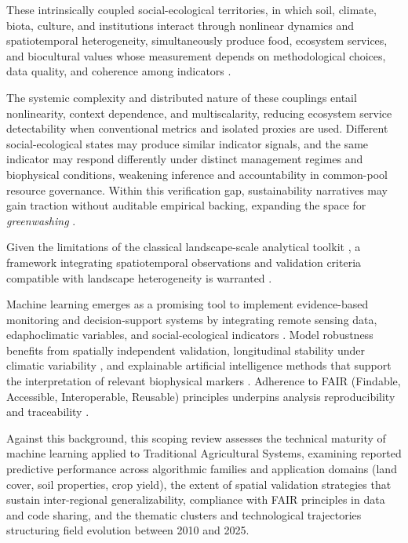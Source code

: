 \documentclass[lineno,pdflatex,sn-apa]{sn-jnl}
\begin{document}
These intrinsically coupled social-ecological territories, in which soil, climate, biota, culture, and institutions interact through nonlinear dynamics and spatiotemporal heterogeneity, simultaneously produce food, ecosystem services, and biocultural values whose measurement depends on methodological choices, data quality, and coherence among indicators \citep{LeFloc2016S}.

The systemic complexity and distributed nature of these couplings entail nonlinearity, context dependence, and multiscalarity, reducing ecosystem service detectability when conventional metrics and isolated proxies are used. Different social-ecological states may produce similar indicator signals, and the same indicator may respond differently under distinct management regimes and biophysical conditions, weakening inference and accountability in common-pool resource governance. Within this verification gap, sustainability narratives may gain traction without auditable empirical backing, expanding the space for \textit{greenwashing} \citep{Levin1998ComplexAdaptiveSystems,Gale2023}.

Given the limitations of the classical landscape-scale analytical toolkit \citep{Liao2023,Weiss2020}, a framework integrating spatiotemporal observations and validation criteria compatible with landscape heterogeneity is warranted \citep{Belgiu2016}.

Machine learning emerges as a promising tool to implement evidence-based monitoring and decision-support systems by integrating remote sensing data, edaphoclimatic variables, and social-ecological indicators \citep{Mountrakis2011,Spyrou2025}. Model robustness benefits from spatially independent validation, longitudinal stability under climatic variability \citep{Kuhn2013}, and explainable artificial intelligence methods that support the interpretation of relevant biophysical markers \citep{Rudin2019}. Adherence to FAIR (Findable, Accessible, Interoperable, Reusable) principles underpins analysis reproducibility and traceability \citep{Wilkinson2016}.

Against this background, this scoping review assesses the technical maturity of machine learning applied to Traditional Agricultural Systems, examining reported predictive performance across algorithmic families and application domains (land cover, soil properties, crop yield), the extent of spatial validation strategies that sustain inter-regional generalizability, compliance with FAIR principles in data and code sharing, and the thematic clusters and technological trajectories structuring field evolution between 2010 and 2025.
\end{document}
